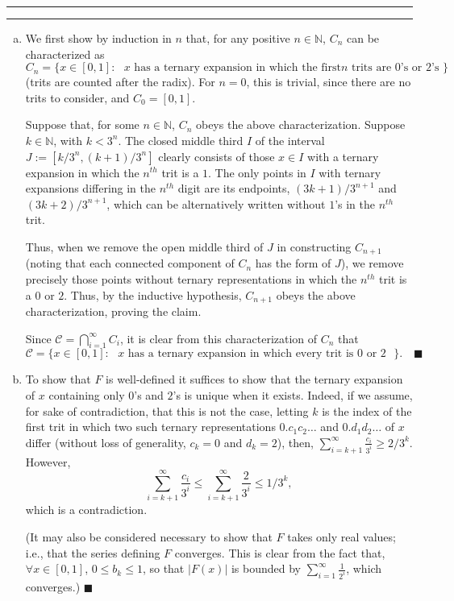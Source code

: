 \documentclass[11pt]{article}
\newcounter{questionCounter}
\newcounter{partCounter}[questionCounter]
\newenvironment{question}[2][\arabic{questionCounter}]{%
    \setcounter{partCounter}{0}%
    \vspace{.25in} \hrule \vspace{0.5em}%
        \noindent{\bf #2}%
    \vspace{0.8em} \hrule \vspace{.10in}%
    \addtocounter{questionCounter}{1}%
}{}
\renewcommand{\qed}{\quad $\blacksquare$}
\newcommand{\mqed}{\quad \blacksquare}
\newcommand{\N}{\mathbb{N}} %
\newcommand{\C}{\mathcal{C}} %
\begin{document}
\begin{question}{Chapter 1, Problem 2}
\begin{enumerate}[(a)]
\item We first show by induction in $n$ that, for any positive $n \in \N$,
$C_n$ can be characterized as
\[
C_n = \{x \in [0,1] : \mbox{ $x$ has a ternary expansion in which the first
$n$ trits are $0$'s or $2$'s }\}
\]
(trits are counted after the radix). For $n = 0$, this is trivial, since there
are no trits to consider, and $C_0 = [0,1]$.

Suppose that, for some $n \in \N$, $C_n$ obeys the above characterization.
Suppose $k \in \N$, with $k < 3^n$. The closed middle third $I$ of the
interval $J := [k/3^n,(k + 1)/3^n]$ clearly consists of those $x \in I$ with
a ternary expansion in which the $n^{th}$ trit is a $1$. The only points in
$I$ with ternary expansions differing in the $n^{th}$ digit are its endpoints,
$(3k + 1)/3^{n + 1}$ and $(3k + 2)/3^{n + 1}$, which can be alternatively
written without $1$'s in the $n^{th}$ trit.

Thus, when we remove the open middle third of $J$ in constructing $C_{n + 1}$
(noting that each connected component of $C_n$ has the form of $J$), we remove
precisely those points without ternary representations in which the $n^{th}$
trit is a $0$ or $2$. Thus, by the inductive hypothesis, $C_{n + 1}$ obeys the
above characterization, proving the claim.

Since $\C = \bigcap_{i = 1}^{\infty} C_i$, it is clear from this
characterization of $C_n$ that
\[\C = \{x \in [0,1] : \mbox{ $x$ has a ternary expansion in which every trit
is $0$ or $2$ }\}. \mqed\]

\item To show that $F$ is well-defined it suffices to show that the ternary
expansion of $x$ containing only $0$'s and $2$'s is unique when it exists.
Indeed, if we assume, for sake of contradiction, that this is not the case,
letting $k$ is the index of the first trit in which two such ternary
representations $0.c_1c_2\ldots$ and $0.d_1d_2\ldots$ of $x$ differ (without
loss of generality, $c_k = 0$ and $d_k = 2$), then,
$\sum_{i = k + 1}^{\infty} \frac{c_i}{3^i} \geq 2/3^k$. However,
\[\sum_{i = k + 1}^{\infty} \frac{c_i}{3^i}
 \leq \sum_{i = k + 1}^{\infty} \frac{2}{3^i}
 \leq 1/3^k,
\]
which is a contradiction.

(It may also be considered necessary to show that $F$ takes only real values;
i.e., that the series defining $F$ converges. This is clear from the fact
that, $\forall x \in [0,1]$, $0 \leq b_k \leq 1$, so that $|F(x)|$ is bounded
by $\sum_{i = 1}^{\infty} \frac{1}{2^i}$, which converges.) \qed


\end{enumerate}
\end{question}
\end{document}
